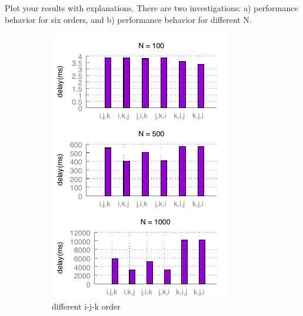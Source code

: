 \documentclass{article}
\begin{document}
Plot your results with explanations. There are two investigations: a) performance behavior for six orders, and b) performance behavior for different N.\\
    \begin{figure}[h!]
        \centering
        \begin{subfigure}[b]{0.4\linewidth}
          \includegraphics[width=\linewidth]{matrix_ijk.pdf}
          \caption{different i-j-k order}
        \end{subfigure}
        \begin{subfigure}[b]{0.4\linewidth}

\end{subfigure}
\end{figure}
\end{document}
